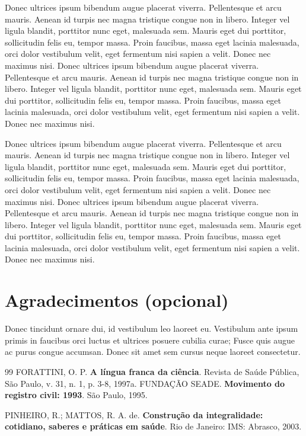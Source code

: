 \documentclass[12pt]{article}
\begin{document}
	Donec ultrices ipsum bibendum augue placerat viverra. Pellentesque et arcu mauris. Aenean id turpis nec magna tristique congue non in libero. Integer vel ligula blandit, porttitor nunc eget, malesuada sem. Mauris eget dui porttitor, sollicitudin felis eu, tempor massa. Proin faucibus, massa eget lacinia malesuada, orci dolor vestibulum velit, eget fermentum nisi sapien a velit. Donec nec maximus nisi. Donec ultrices ipsum bibendum augue placerat viverra. Pellentesque et arcu mauris. Aenean id turpis nec magna tristique congue non in libero. Integer vel ligula blandit, porttitor nunc eget, malesuada sem. Mauris eget dui porttitor, sollicitudin felis eu, tempor massa. Proin faucibus, massa eget lacinia malesuada, orci dolor vestibulum velit, eget fermentum nisi sapien a velit. Donec nec maximus nisi.
	
	Donec ultrices ipsum bibendum augue placerat viverra. Pellentesque et arcu mauris. Aenean id turpis nec magna tristique congue non in libero. Integer vel ligula blandit, porttitor nunc eget, malesuada sem. Mauris eget dui porttitor, sollicitudin felis eu, tempor massa. Proin faucibus, massa eget lacinia malesuada, orci dolor vestibulum velit, eget fermentum nisi sapien a velit. Donec nec maximus nisi. Donec ultrices ipsum bibendum augue placerat viverra. Pellentesque et arcu mauris. Aenean id turpis nec magna tristique congue non in libero. Integer vel ligula blandit, porttitor nunc eget, malesuada sem. Mauris eget dui porttitor, sollicitudin felis eu, tempor massa. Proin faucibus, massa eget lacinia malesuada, orci dolor vestibulum velit, eget fermentum nisi sapien a velit. Donec nec maximus nisi.
	
\section*{Agradecimentos (opcional)}

Donec tincidunt ornare dui, id vestibulum leo laoreet eu. Vestibulum ante ipsum primis in faucibus orci luctus et ultrices posuere cubilia curae; Fusce quis augue ac purus congue accumsan. Donec sit amet sem cursus neque laoreet consectetur. 

\begin{thebibliography}{99}
FORATTINI, O. P. \textbf{A língua franca da ciência}. Revista de Saúde Pública, São Paulo, v. 31, n. 1, p. 3-8, 1997a.
FUNDAÇÃO SEADE. \textbf{Movimento do registro civil: 1993}. São Paulo, 1995.

PINHEIRO, R.; MATTOS, R. A. de. \textbf{Construção da integralidade: cotidiano, saberes e práticas em saúde}. Rio de Janeiro: IMS: Abrasco, 2003.
\end{thebibliography}
\end{document}
